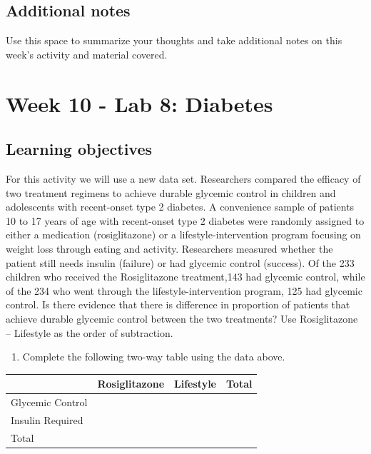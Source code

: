 \documentclass[
]{report}
\providecommand{\tightlist}{%
  \setlength{\itemsep}{0pt}\setlength{\parskip}{0pt}}
\begin{document}
\hypertarget{additional-notes-13}{%
\subsection{Additional notes}\label{additional-notes-13}}

Use this space to summarize your thoughts and take additional notes on this week's activity and material covered.

\newpage

\hypertarget{week-10---lab-8-diabetes}{%
\section{Week 10 - Lab 8: Diabetes}\label{week-10---lab-8-diabetes}}


\hypertarget{learning-objectives-17}{%
\subsection{Learning objectives}\label{learning-objectives-17}}

For this activity we will use a new data set. Researchers compared the efficacy of two treatment regimens to achieve durable glycemic control in children and adolescents with recent-onset type 2 diabetes. A convenience sample of patients 10 to 17 years of age with recent-onset type 2 diabetes were randomly assigned to either a medication (rosiglitazone) or a lifestyle-intervention program focusing on weight loss through eating and activity. Researchers measured whether the patient still needs insulin (failure) or had glycemic control (success). Of the 233 children who received the Rosiglitazone treatment,143 had glycemic control, while of the 234 who went through the lifestyle-intervention program, 125 had glycemic control. Is there evidence that there is difference in proportion of patients that achieve durable glycemic control between the two treatments? Use Rosiglitazone -- Lifestyle as the order of subtraction.

\begin{enumerate}
\def\labelenumi{\arabic{enumi}.}
\setcounter{enumi}{1}
\tightlist
\item
  Complete the following two-way table using the data above.
\end{enumerate}

\begin{longtable}[]{@{}llll@{}}
\toprule
& Rosiglitazone & Lifestyle & Total \\
\midrule
\endhead
Glycemic Control & & & \\
Insulin Required & & & \\
Total & & & \\
\bottomrule
\end{longtable}
\end{document}
